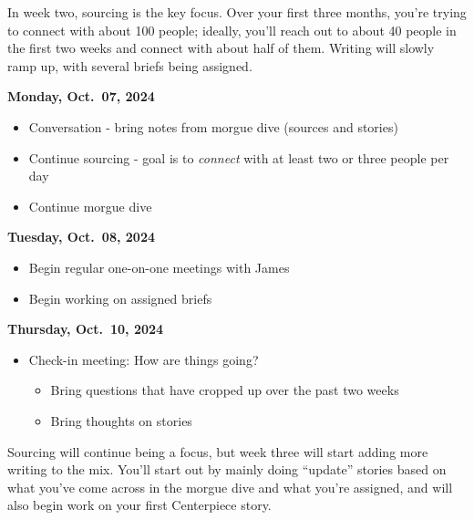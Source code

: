 \documentclass[
  11pt,
  american,
  letterpaperpaper,
  extrafontsizes,onecolumn,openright
  ]{memoir}
\providecommand{\tightlist}{%
  \setlength{\itemsep}{0pt}\setlength{\parskip}{0pt}}
\begin{document}
\leavevmode{}%
\begin{greybox}[frametitle=Onboarding Path - Week 2]
In week two, sourcing is the key focus. Over your first three months, you're trying to connect with about 100 people; ideally, you'll reach out to about 40 people in the first two weeks and connect with about half of them. Writing will slowly ramp up, with several briefs being assigned.

\end{greybox}

\textbf{Monday, Oct.~07, 2024}

\begin{itemize}
\tightlist
\item
  Conversation - bring notes from morgue dive (sources and stories)
\item
  Continue sourcing - goal is to \emph{connect} with at least two or three people per day
\item
  Continue morgue dive
\end{itemize}

\textbf{Tuesday, Oct.~08, 2024}

\begin{itemize}
\tightlist
\item
  Begin regular one-on-one meetings with James
\item
  Begin working on assigned briefs
\end{itemize}

\textbf{Thursday, Oct.~10, 2024}

\begin{itemize}
\tightlist
\item
  Check-in meeting: How are things going?

  \begin{itemize}
  \tightlist
  \item
    Bring questions that have cropped up over the past two weeks
  \item
    Bring thoughts on stories
  \end{itemize}
\end{itemize}

\newpage

\leavevmode{}%
\begin{greybox}[frametitle=Onboarding Path - Week 3]
Sourcing will continue being a focus, but week three will start adding more writing to the mix. You'll start out by mainly doing \enquote{update} stories based on what you've come across in the morgue dive and what you're assigned, and will also begin work on your first Centerpiece story.

\end{greybox}
\end{document}
